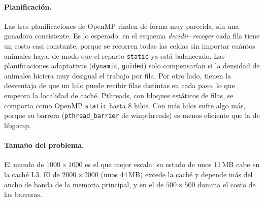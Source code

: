 \paragraph{Planificación.} Las tres planificaciones de OpenMP rinden de forma muy parecida, sin una
ganadora consistente. Es lo esperado: en el esquema \emph{decidir--recoger} cada fila tiene un costo casi
constante, porque se recorren todas las celdas sin importar cuántos animales haya, de modo que el reparto
\texttt{static} ya está balanceado. Las planificaciones adaptativas (\texttt{dynamic}, \texttt{guided}) solo
compensarían si la densidad de animales hiciera muy desigual el trabajo por fila. Por otro lado, tienen la
desventaja de que un hilo puede recibir filas distintas en cada paso, lo que empeora la localidad de caché.
Pthreads, con bloques estáticos de filas, se comporta como OpenMP \texttt{static} hasta 8 hilos. Con más
hilos sufre algo más, porque su barrera (\texttt{pthread\_barrier} de winpthreads) es menos eficiente que la
de libgomp.

\paragraph{Tamaño del problema.} El mundo de $1000\times1000$ es el que mejor escala: su estado de unos
11\,MB cabe en la caché L3. El de $2000\times2000$ (unos 44\,MB) excede la caché y depende más del ancho de
banda de la memoria principal, y en el de $500\times500$ domina el costo de las barreras.
